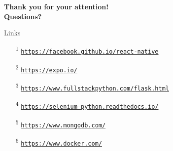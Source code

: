 \documentclass{beamer}
\begin{document}
  \begin{frame}[plain]{}
    \centering
    \Large \textbf{Thank you for your attention!}\\
    \vspace{2em}
    \Large \textbf{Questions?}
  \end{frame}


  \begin{frame}[plain]{Links}
    \begin{itemize}
      \item[\textsuperscript{1}] \label{link-react-native}\href{https://facebook.github.io/react-native}{\texttt{https://facebook.github.io/react-native}}
      \item[\textsuperscript{2}] \label{link-expo}\href{https://expo.io/}{\texttt{https://expo.io/}}
      \item[\textsuperscript{3}] \label{link-flask}\href{https://www.fullstackpython.com/flask.html}{\texttt{https://www.fullstackpython.com/flask.html}}
      \item[\textsuperscript{4}] \label{link-selenium}\href{https://selenium-python.readthedocs.io/}{\texttt{https://selenium-python.readthedocs.io/}}
      \item[\textsuperscript{5}] \label{link-mongodb}\href{https://www.mongodb.com/}{\texttt{https://www.mongodb.com/}}
      \item[\textsuperscript{6}] \label{link-mongodb}\href{https://www.docker.com/}{\texttt{https://www.docker.com/}}
    \end{itemize}
  \end{frame}
\end{document}
